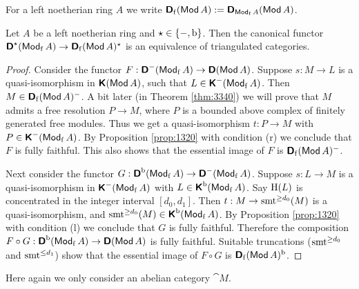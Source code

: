 For a left noetherian ring $A$ we write 
$\boldsymbol{\mathsf{D}}_{\mathrm{f}}(\operatorname{\mathsf{Mod}} A) :=
\boldsymbol{\mathsf{D}}_{\operatorname{\mathsf{Mod}}_{\mathrm{f}} A}(\operatorname{\mathsf{Mod}} A)$.

\begin{prop} \label{prop:200}
Let $A$ be a left noetherian ring and $\star \in \{ -, \mathrm{b} \}$. Then the
canonical functor 
$\boldsymbol{\mathsf{D}}^{\star}(\operatorname{\mathsf{Mod}}_{\mathrm{f}} A) \to 
\boldsymbol{\mathsf{D}}_{\mathrm{f}}(\operatorname{\mathsf{Mod}} A)^{\star}$
is an equivalence of triangulated categories.
\end{prop}

\begin{proof}
Consider the functor 
$F : \boldsymbol{\mathsf{D}}^{-}(\operatorname{\mathsf{Mod}}_{\mathrm{f}} A) \to \boldsymbol{\mathsf{D}}(\operatorname{\mathsf{Mod}} A)$.
Suppose $s : M \to L$ is a quasi-isomorphism in $\boldsymbol{\mathsf{K}}(\operatorname{\mathsf{Mod}} A)$,
such that $L \in \boldsymbol{\mathsf{K}}^{-}(\operatorname{\mathsf{Mod}}_{\mathrm{f}} A)$. 
Then $M \in \boldsymbol{\mathsf{D}}_{\mathrm{f}}(\operatorname{\mathsf{Mod}} A)^{-}$.
A bit later (in Theorem \ref{thm:3340}) we will prove that $M$ 
admits a free resolution $P \to M$, where $P$ is a
bounded above complex of finitely generated free modules. 
Thus we get a quasi-isomorphism $t : P \to M$ with 
$P \in \boldsymbol{\mathsf{K}}^{-}(\operatorname{\mathsf{Mod}}_{\mathrm{f}} A)$.  By Proposition \ref{prop:1320} 
with condition (r) we conclude that $F$ is fully faithful. This also shows 
that the essential image of $F$ is 
$\boldsymbol{\mathsf{D}}_{\mathrm{f}}(\operatorname{\mathsf{Mod}} A)^{-}$.
 
Next consider the functor 
$G : \boldsymbol{\mathsf{D}}^{\mathrm{b}}(\operatorname{\mathsf{Mod}}_{\mathrm{f}} A) \to 
\boldsymbol{\mathsf{D}}^{-}(\operatorname{\mathsf{Mod}}_{\mathrm{f}} A)$.
Suppose $s : L \to M$ is a quasi-isomorphism in 
$\boldsymbol{\mathsf{K}}^-(\operatorname{\mathsf{Mod}}_{\mathrm{f}} A)$
with $L \in \boldsymbol{\mathsf{K}}^{\mathrm{b}}(\operatorname{\mathsf{Mod}}_{\mathrm{f}} A)$. 
Say $\operatorname{H}(L)$ is concentrated in the integer interval $[d_0, d_1]$. 
Then 
$t : M \to \operatorname{smt}^{\geq d_0}(M)$
is a quasi-isomorphism, and 
$\operatorname{smt}^{\geq d_0}(M) \in \boldsymbol{\mathsf{K}}^{\mathrm{b}}(\operatorname{\mathsf{Mod}}_{\mathrm{f}} A)$. 
By Proposition \ref{prop:1320} with condition (l) we conclude that $G$ is 
fully faithful. Therefore the composition 
$F \circ G : \boldsymbol{\mathsf{D}}^{\mathrm{b}}(\operatorname{\mathsf{Mod}}_{\mathrm{f}} A) \to 
\boldsymbol{\mathsf{D}}(\operatorname{\mathsf{Mod}} A)$
is fully faithful. Suitable truncations ($\operatorname{smt}^{\geq d_0}$ and 
$\operatorname{smt}^{\leq d_1}$) show that the essential image of $F \circ G$ is 
$\boldsymbol{\mathsf{D}}_{\mathrm{f}}(\operatorname{\mathsf{Mod}} A)^{\mathrm{b}}$.
\end{proof}





Here again we only consider an abelian category $\cat{M}$. 

